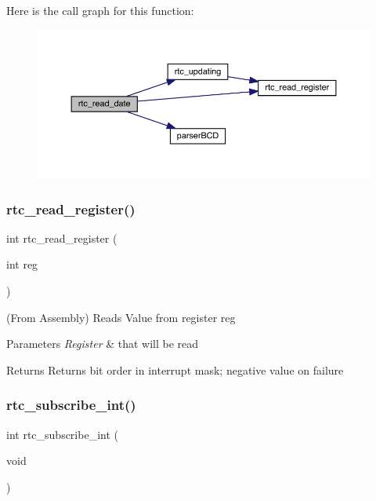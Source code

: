 Here is the call graph for this function\+:\nopagebreak
\begin{figure}[H]
\begin{center}
\leavevmode
\includegraphics[width=350pt]{group___serial_ga08a02c163edf9dc74b2d15dfb23a2624_cgraph}
\end{center}
\end{figure}
\hypertarget{group___serial_ga50431f28993883d49a09ce054bd5c0ec}{}\label{group___serial_ga50431f28993883d49a09ce054bd5c0ec} 
\subsubsection{\texorpdfstring{rtc\+\_\+read\+\_\+register()}{rtc\_read\_register()}}
{\footnotesize\ttfamily int rtc\+\_\+read\+\_\+register (\begin{DoxyParamCaption}\item[{int}]{reg }\end{DoxyParamCaption})}



(From Assembly) Reads Value from register reg 


\begin{DoxyParams}{Parameters}
{\em Register} & that will be read\\
\hline
\end{DoxyParams}
\begin{DoxyReturn}{Returns}
Returns bit order in interrupt mask; negative value on failure 
\end{DoxyReturn}
\hypertarget{group___serial_ga6bd13bd1e0cd043f50abb97bcc138bfa}{}\label{group___serial_ga6bd13bd1e0cd043f50abb97bcc138bfa} 
\subsubsection{\texorpdfstring{rtc\+\_\+subscribe\+\_\+int()}{rtc\_subscribe\_int()}}
{\footnotesize\ttfamily int rtc\+\_\+subscribe\+\_\+int (\begin{DoxyParamCaption}\item[{void}]{ }\end{DoxyParamCaption})}



